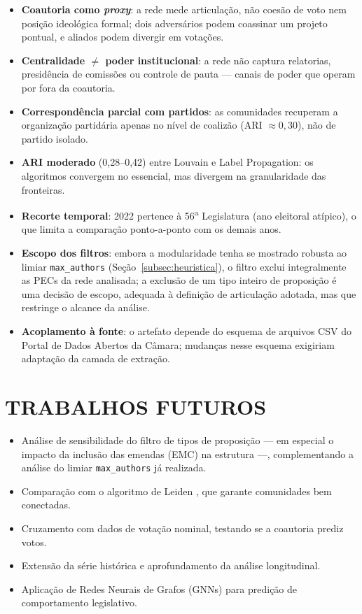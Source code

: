 \documentclass[
      12pt,
      a4paper,
      openright,
      oneside,
      chapter=TITLE,
      section=TITLE,
      english,
      french,
      spanish,
      brazilian
    ]{abntex2}
\begin{document}
    \begin{itemize}
        \item \textbf{Coautoria como \textit{proxy}}: a rede mede articulação, não coesão de voto nem posição ideológica formal; dois adversários podem coassinar um projeto pontual, e aliados podem divergir em votações.
        \item \textbf{Centralidade $\neq$ poder institucional}: a rede não captura relatorias, presidência de comissões ou controle de pauta --- canais de poder que operam por fora da coautoria.
        \item \textbf{Correspondência parcial com partidos}: as comunidades recuperam a organização partidária apenas no nível de coalizão (ARI $\approx 0{,}30$), não de partido isolado.
        \item \textbf{ARI moderado} (0,28--0,42) entre Louvain e Label Propagation: os algoritmos convergem no essencial, mas divergem na granularidade das fronteiras.
        \item \textbf{Recorte temporal}: 2022 pertence à 56\textsuperscript{a} Legislatura (ano eleitoral atípico), o que limita a comparação ponto-a-ponto com os demais anos.
        \item \textbf{Escopo dos filtros}: embora a modularidade tenha se mostrado robusta ao limiar \texttt{max\_authors} (Seção~\ref{subsec:heuristica}), o filtro exclui integralmente as PECs da rede analisada; a exclusão de um tipo inteiro de proposição é uma decisão de escopo, adequada à definição de articulação adotada, mas que restringe o alcance da análise.
        \item \textbf{Acoplamento à fonte}: o artefato depende do esquema de arquivos CSV do Portal de Dados Abertos da Câmara; mudanças nesse esquema exigiriam adaptação da camada de extração.
    \end{itemize}
    
    \section{TRABALHOS FUTUROS}
    
    \begin{itemize}
        \item Análise de sensibilidade do filtro de tipos de proposição --- em especial o impacto da inclusão das emendas (EMC) na estrutura ---, complementando a análise do limiar \texttt{max\_authors} já realizada.
        \item Comparação com o algoritmo de Leiden , que garante comunidades bem conectadas.
        \item Cruzamento com dados de votação nominal, testando se a coautoria prediz votos.
        \item Extensão da série histórica e aprofundamento da análise longitudinal.
        \item Aplicação de Redes Neurais de Grafos (GNNs) para predição de comportamento legislativo.
    \end{itemize}
    
\end{document}
